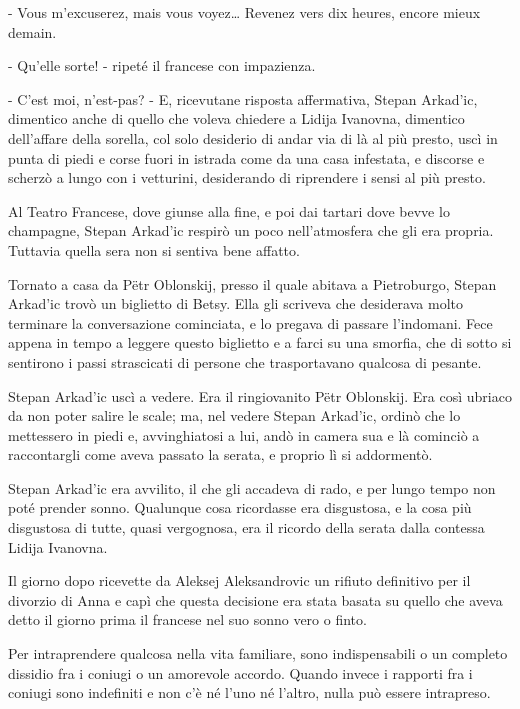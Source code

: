 - Vous m'excuserez, mais vous voyez\ldots{} Revenez vers dix heures, encore mieux demain. 

- Qu'elle sorte! - ripeté il francese con impazienza. 

- C'est moi, n'est-pas? - E, ricevutane risposta affermativa, Stepan Arkad'ic, dimentico anche di quello che voleva chiedere a Lidija Ivanovna, dimentico dell'affare della sorella, col solo desiderio di andar via di là al più presto, uscì in punta di piedi e corse fuori in istrada come da una casa infestata, e discorse e scherzò a lungo con i vetturini, desiderando di riprendere i sensi al più presto. 

Al Teatro Francese, dove giunse alla fine, e poi dai tartari dove bevve lo champagne, Stepan Arkad'ic respirò un poco nell'atmosfera che gli era propria. Tuttavia quella sera non si sentiva bene affatto. 

Tornato a casa da Pëtr Oblonskij, presso il quale abitava a Pietroburgo, Stepan Arkad'ic trovò un biglietto di Betsy. Ella gli scriveva che desiderava molto terminare la conversazione cominciata, e lo pregava di passare l'indomani. Fece appena in tempo a leggere questo biglietto e a farci su una smorfia, che di sotto si sentirono i passi strascicati di persone che trasportavano qualcosa di pesante. 

Stepan Arkad'ic uscì a vedere. Era il ringiovanito Pëtr Oblonskij. Era così ubriaco da non poter salire le scale; ma, nel vedere Stepan Arkad'ic, ordinò che lo mettessero in piedi e, avvinghiatosi a lui, andò in camera sua e là cominciò a raccontargli come aveva passato la serata, e proprio lì si addormentò. 

Stepan Arkad'ic era avvilito, il che gli accadeva di rado, e per lungo tempo non poté prender sonno. Qualunque cosa ricordasse era disgustosa, e la cosa più disgustosa di tutte, quasi vergognosa, era il ricordo della serata dalla contessa Lidija Ivanovna. 

Il giorno dopo ricevette da Aleksej Aleksandrovic un rifiuto definitivo per il divorzio di Anna e capì che questa decisione era stata basata su quello che aveva detto il giorno prima il francese nel suo sonno vero o finto. 

\label{xxiii-6} 

Per intraprendere qualcosa nella vita familiare, sono indispensabili o un completo dissidio fra i coniugi o un amorevole accordo. Quando invece i rapporti fra i coniugi sono indefiniti e non c'è né l'uno né l'altro, nulla può essere intrapreso. 

